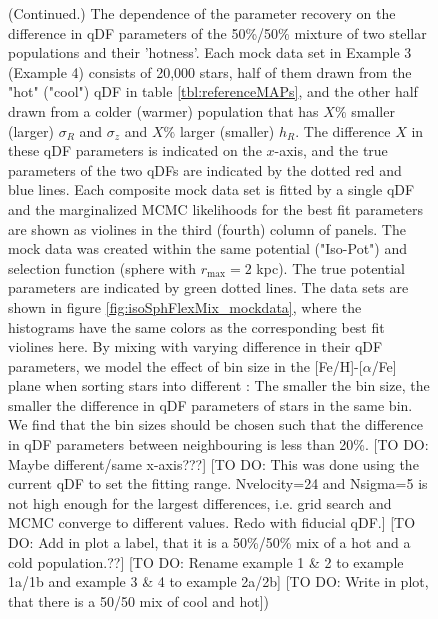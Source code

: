 \addtocounter{figure}{-1}
\begin{figure} [t!]
  \caption{(Continued.) The dependence of the parameter recovery on the difference in qDF parameters of the 50\%/50\% mixture of two stellar populations and their 'hotness'. Each mock data set in Example 3 (Example 4) consists of 20,000 stars, half of them drawn from the "hot" ("cool") qDF in table \ref{tbl:referenceMAPs}, and the other half drawn from a colder (warmer) population that has $X\%$ smaller (larger) $\sigma_R$ and $\sigma_z$ and $X\%$ larger (smaller) $h_R$. The difference $X$ in these qDF parameters is indicated on the $x$-axis, and the true parameters of the two qDFs are indicated by the dotted red and blue lines. Each composite mock data set is fitted by a single qDF and the marginalized MCMC likelihoods for the best fit parameters are shown as violines in the third (fourth) column of panels. The mock data was created within the same potential ("Iso-Pot") and selection function (sphere with $r_\text{max} = 2$ kpc). The true potential parameters are indicated by green dotted lines. The data sets are shown in figure \ref{fig:isoSphFlexMix_mockdata}, where the histograms have the same colors as the corresponding best fit violines here. By mixing \MAPs with varying difference in their qDF parameters, we model the effect of bin size in the [Fe/H]-[$\alpha$/Fe] plane when sorting stars into different \MAPs: The smaller the bin size, the smaller the difference in qDF parameters of stars in the same bin. We find that the bin sizes should be chosen such that the difference in qDF parameters between neighbouring \MAPs is less than 20\%.
[TO DO: Maybe different/same x-axis???] [TO DO: This was done using the current qDF to set the fitting range. Nvelocity=24 and Nsigma=5 is not high enough for the largest differences, i.e. grid search and MCMC converge to different values. Redo with fiducial qDF.] [TO DO: Add in plot a label, that it is a 50\%/50\% mix of a hot and a cold population.??] [TO DO: Rename example 1 \& 2 to example 1a/1b and example 3 \& 4 to example 2a/2b] [TO DO: Write in plot, that there is a 50/50 mix of cool and hot])} 
\end{figure}

